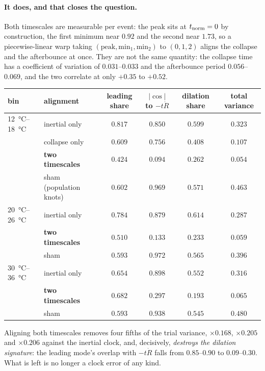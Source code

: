 \documentclass[10pt]{article}
\begin{document}
\paragraph{It does, and that closes the question.} Both timescales are measurable per event:
the peak sits at $t_{\rm norm}=0$ by construction, the first minimum near $0.92$ and the second
near $1.73$, so a piecewise-linear warp taking $(\text{peak}, \text{min}_1, \text{min}_2)$ to
$(0,1,2)$ aligns the collapse and the afterbounce at once. They are not the same quantity: the
collapse time has a coefficient of variation of $0.031$--$0.033$ and the afterbounce period
$0.056$--$0.069$, and the two correlate at only $+0.35$ to $+0.52$.

\begin{center}
\begin{tabular}{llcccc}
\toprule
bin & alignment & leading share & $\lvert\cos\rvert$ to $-t\dot R$ & dilation share & total variance \\
\midrule
\SIrange{12}{18}{\celsius} & inertial only & $0.817$ & $0.850$ & $0.599$ & $0.323$ \\
 & collapse only & $0.609$ & $0.756$ & $0.408$ & $0.107$ \\
 & \textbf{two timescales} & $0.424$ & $\mathbf{0.094}$ & $\mathbf{0.262}$ & $\mathbf{0.054}$ \\
 & sham (population knots) & $0.602$ & $0.969$ & $0.571$ & $0.463$ \\
\midrule
\SIrange{20}{26}{\celsius} & inertial only & $0.784$ & $0.879$ & $0.614$ & $0.287$ \\
 & \textbf{two timescales} & $0.510$ & $\mathbf{0.133}$ & $\mathbf{0.233}$ & $\mathbf{0.059}$ \\
 & sham & $0.593$ & $0.972$ & $0.565$ & $0.396$ \\
\midrule
\SIrange{30}{36}{\celsius} & inertial only & $0.654$ & $0.898$ & $0.552$ & $0.316$ \\
 & \textbf{two timescales} & $0.682$ & $\mathbf{0.297}$ & $\mathbf{0.193}$ & $\mathbf{0.065}$ \\
 & sham & $0.593$ & $0.938$ & $0.545$ & $0.480$ \\
\bottomrule
\end{tabular}
\end{center}

\noindent Aligning both timescales removes four fifths of the trial variance, $\times 0.168$,
$\times 0.205$ and $\times 0.206$ against the inertial clock, and, decisively, \emph{destroys
the dilation signature}: the leading mode's overlap with $-t\dot R$ falls from $0.85$--$0.90$ to
$0.09$--$0.30$. What is left is no longer a clock error of any kind.
\end{document}
